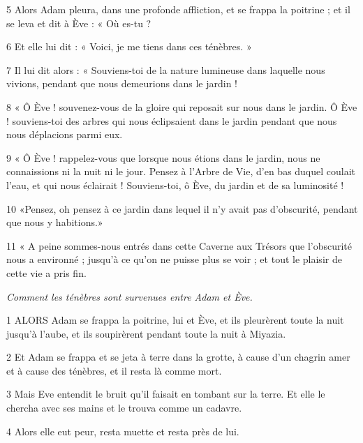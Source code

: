 \par 5 Alors Adam pleura, dans une profonde affliction, et se frappa la poitrine ; et il se leva et dit à Ève : « Où es-tu ?

\par 6 Et elle lui dit : « Voici, je me tiens dans ces ténèbres. »

\par 7 Il lui dit alors : « Souviens-toi de la nature lumineuse dans laquelle nous vivions, pendant que nous demeurions dans le jardin !

\par 8 « Ô Ève ! souvenez-vous de la gloire qui reposait sur nous dans le jardin. Ô Ève ! souviens-toi des arbres qui nous éclipsaient dans le jardin pendant que nous nous déplacions parmi eux.

\par 9 « Ô Ève ! rappelez-vous que lorsque nous étions dans le jardin, nous ne connaissions ni la nuit ni le jour. Pensez à l’Arbre de Vie, d’en bas duquel coulait l’eau, et qui nous éclairait ! Souviens-toi, ô Ève, du jardin et de sa luminosité !

\par 10 «Pensez, oh pensez à ce jardin dans lequel il n'y avait pas d'obscurité, pendant que nous y habitions.»

\par 11 « A peine sommes-nous entrés dans cette Caverne aux Trésors que l'obscurité nous a environné ; jusqu'à ce qu'on ne puisse plus se voir ; et tout le plaisir de cette vie a pris fin.


\par \textit{Comment les ténèbres sont survenues entre Adam et Ève.}

\par 1 ALORS Adam se frappa la poitrine, lui et Ève, et ils pleurèrent toute la nuit jusqu'à l'aube, et ils soupirèrent pendant toute la nuit à Miyazia.

\par 2 Et Adam se frappa et se jeta à terre dans la grotte, à cause d'un chagrin amer et à cause des ténèbres, et il resta là comme mort.

\par 3 Mais Eve entendit le bruit qu'il faisait en tombant sur la terre. Et elle le chercha avec ses mains et le trouva comme un cadavre.

\par 4 Alors elle eut peur, resta muette et resta près de lui.

